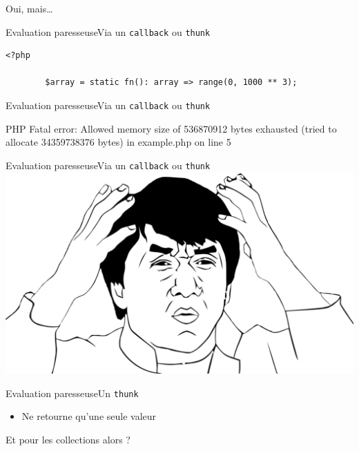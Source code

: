\begin{frameC}{Oui, mais\ldots}

\end{frameC}

\begin{frame}[fragile]{Evaluation paresseuse}{Via un \texttt{callback} ou \texttt{thunk}}
    \begin{lstlisting}[firstnumber=1]
        <?php

        $array = static fn(): array => range(0, 1000 ** 3);
    \end{lstlisting}
\end{frame}

\begin{frame}[fragile]{Evaluation paresseuse}{Via un \texttt{callback} ou \texttt{thunk}}
    \begin{spverbatim}
        PHP Fatal error: Allowed memory size of 536870912 bytes exhausted (tried to allocate 34359738376 bytes) in example.php on line 5
    \end{spverbatim}
\end{frame}

\begin{frame}[fragile]{Evaluation paresseuse}{Via un \texttt{callback} ou \texttt{thunk}}
    \includegraphics[width=\textwidth]{meme/wtf.png}
\end{frame}

\begin{frame}{Evaluation paresseuse}{Un \texttt{thunk}}
    \begin{itemize}[<+->]
        \item Ne retourne qu'une seule valeur
    \end{itemize}
\end{frame}

\begin{frameC}{Et pour les collections alors ?}

\end{frameC}

